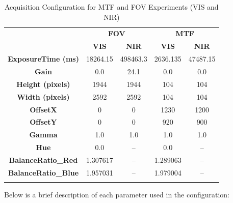\begin{longtable}[c]{c|cc|cc}
\hline
\rowcolor[HTML]{EFEFEF} 
\cellcolor[HTML]{EFEFEF} &
  \multicolumn{2}{c|}{\cellcolor[HTML]{EFEFEF}\textbf{FOV}} &
  \multicolumn{2}{c}{\cellcolor[HTML]{EFEFEF}\textbf{MTF}} \\
\rowcolor[HTML]{EFEFEF} 
\multirow{-2}{*}{\cellcolor[HTML]{EFEFEF}\textbf{Parameter}} &
  \textbf{VIS} &
  \textbf{NIR} &
  \textbf{VIS} &
  \textbf{NIR} \\ \hline
\endfirsthead
%
\endhead
%
\hline
\endfoot
%
\endlastfoot
%
\textbf{ExposureTime (ms)}  & 18264.15 & 498463.3 & 2636.135 & 47487.15 \\
\rowcolor[HTML]{EFEFEF} 
\textbf{Gain}               & 0.0      & 24.1     & 0.0      & 0.0      \\
\textbf{Height (pixels)}    & 1944     & 1944     & 104      & 104      \\
\rowcolor[HTML]{EFEFEF} 
\textbf{Width (pixels)}     & 2592     & 2592     & 104      & 104      \\
\textbf{OffsetX}            & 0        & 0        & 1230     & 1200     \\
\rowcolor[HTML]{EFEFEF} 
\textbf{OffsetY}            & 0        & 0        & 920      & 900      \\
\textbf{Gamma}              & 1.0      & 1.0      & 1.0      & 1.0      \\
\rowcolor[HTML]{EFEFEF} 
\textbf{Hue}                & 0.0      & --       & 0.0      & --       \\
\textbf{BalanceRatio\_Red}  & 1.307617 & --       & 1.289063 & --       \\
\rowcolor[HTML]{EFEFEF} 
\textbf{BalanceRatio\_Blue} & 1.957031 & --       & 1.979004 & --       \\ \hline
\caption{Acquisition Configuration for MTF and FOV Experiments (VIS and NIR)}
\label{tab:tab:fov_mtf}\\
\end{longtable}

\noindent Below is a brief description of each parameter used in the configuration:

